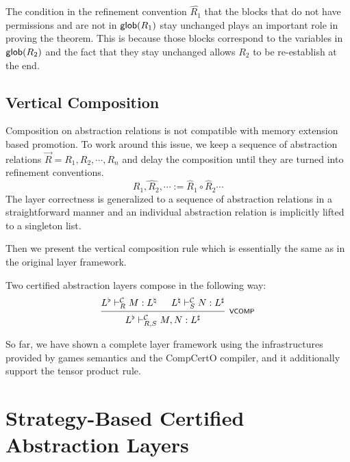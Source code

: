 \documentclass[acmsmall,review,anonymous]{acmart}\settopmatter{printfolios=true,printccs=false,printacmref=false}
\begin{document}
The condition in the refinement convention $\hat{R_1}$
that the blocks that do not have permissions
and are not in $ \mathsf{glob} (R_1)$ stay unchanged
plays an important role in proving the theorem.
This is because those blocks correspond to
the variables in $ \mathsf{glob} (R_2)$
and the fact that they stay unchanged
allows $R_2$ to be re-establish at the end.


\subsection{Vertical Composition} %
\label{sec:ccal:vcomp}

Composition on abstraction relations
is not compatible with
memory extension based promotion\cite[\S4.4]{thesis}.
To work around this issue,
we keep a sequence of abstraction relations
$\vec{R} = R_1, R_2, \cdots, R_n$
and delay the composition
until they are turned into refinement conventions.
\[
  \widehat{R_1, R_2, \cdots} :=
  \hat{R}_1 \circ \hat{R}_2 \cdots
\]
The layer correctness
is generalized to a sequence of
abstraction relations
in a straightforward manner
and an individual abstraction relation
is implicitly lifted to a singleton list.

Then we present the vertical composition rule
which is essentially the same as
in the original layer framework.

\begin{theorem}
  Two certified abstraction layers compose
  in the following way:
  \[
    \begin{prooftree}
      \hypo{L^\flat \vdash^\mathcal{C}_{R} M : L^\natural}
      \hypo{L^\natural \vdash^\mathcal{C}_{S} N : L^\sharp}
      \infer2[\scriptsize\kw{VCOMP}]{L^\flat \vdash^\mathcal{C}_{R,S} M, N : L^\sharp}
    \end{prooftree}
  \]
\end{theorem}

So far,
we have shown a complete layer framework
using the infrastructures
provided by games semantics and the CompCertO compiler,
and it additionally
support the tensor product rule.



\section{Strategy-Based Certified Abstraction Layers} \label{sec:rbgs-cal} %
\end{document}
